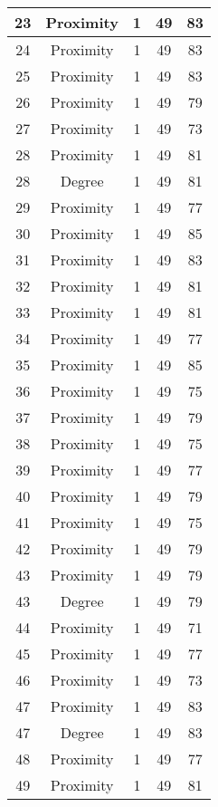 \documentclass[results.tex]{subfiles}
\begin{document}
\begin{center}
\begin{tabular}{| c || c | c | c | c |}
    \hline
    23 & Proximity & 1 & 49 & 83 \\ 
    \hline
    24 & Proximity & 1 & 49 & 83 \\ 
    \hline
    25 & Proximity & 1 & 49 & 83 \\ 
    \hline
    26 & Proximity & 1 & 49 & 79 \\ 
    \hline
    27 & Proximity & 1 & 49 & 73 \\ 
    \hline
    28 & Proximity & 1 & 49 & 81 \\ 
    \hline
    28 & Degree & 1 & 49 & 81 \\ 
    \hline
    29 & Proximity & 1 & 49 & 77 \\ 
    \hline
    30 & Proximity & 1 & 49 & 85 \\ 
    \hline
    31 & Proximity & 1 & 49 & 83 \\ 
    \hline
    32 & Proximity & 1 & 49 & 81 \\ 
    \hline
    33 & Proximity & 1 & 49 & 81 \\ 
    \hline
    34 & Proximity & 1 & 49 & 77 \\ 
    \hline
    35 & Proximity & 1 & 49 & 85 \\ 
    \hline
    36 & Proximity & 1 & 49 & 75 \\ 
    \hline
    37 & Proximity & 1 & 49 & 79 \\ 
    \hline
    38 & Proximity & 1 & 49 & 75 \\ 
    \hline
    39 & Proximity & 1 & 49 & 77 \\ 
    \hline
    40 & Proximity & 1 & 49 & 79 \\ 
    \hline
    41 & Proximity & 1 & 49 & 75 \\ 
    \hline
    42 & Proximity & 1 & 49 & 79 \\ 
    \hline
    43 & Proximity & 1 & 49 & 79 \\ 
    \hline
    43 & Degree & 1 & 49 & 79 \\ 
    \hline
    44 & Proximity & 1 & 49 & 71 \\ 
    \hline
    45 & Proximity & 1 & 49 & 77 \\ 
    \hline
    46 & Proximity & 1 & 49 & 73 \\ 
    \hline
    47 & Proximity & 1 & 49 & 83 \\ 
    \hline
    47 & Degree & 1 & 49 & 83 \\ 
    \hline
    48 & Proximity & 1 & 49 & 77 \\ 
    \hline
    49 & Proximity & 1 & 49 & 81 \\ 
    \hline   \end{tabular}
\end{center}
\end{document}
